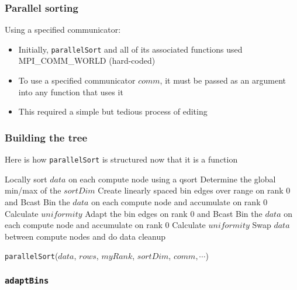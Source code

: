 \documentclass{beamer}
\begin{document}
\begin{frame}
	\frametitle{Parallel sorting}
	
	\begin{block}{Using a specified communicator:}
		\begin{itemize}
			\item Initially, \texttt{parallelSort} and all of its associated functions used MPI\_COMM\_WORLD (hard-coded)
			\item To use a specified communicator $comm$, it must be passed as an argument into any function that uses it
			\item This required a simple but tedious process of editing
		\end{itemize}
	\end{block}
\end{frame}

\begin{frame}
	\frametitle{Building the tree}
	
	Here is how \texttt{parallelSort} is structured now that it is a function
	
	\vspace{10pt}
	
	\begin{algorithm}[H]
		\begin{algorithmic}[1]
			\STATE Locally sort $data$ on each compute node using a qsort
			\STATE Determine the global min/max of the $sortDim$
			\STATE Create linearly spaced bin edges over range on rank 0 and Bcast
			\STATE Bin the $data$ on each compute node and accumulate on rank 0
			\STATE Calculate $uniformity$
				\STATE Adapt the bin edges on rank 0 and Bcast
				\STATE Bin the $data$ on each compute node and accumulate on rank 0
				\STATE Calculate $uniformity$
			\ENDWHILE
			\STATE Swap $data$ between compute nodes and do data cleanup
		\end{algorithmic}
		\caption{\texttt{parallelSort}($data$, $rows$, $myRank$, $sortDim$, $comm, \cdots$)}
	\end{algorithm}
		
\end{frame}


\subsubsection{\texttt{adaptBins}}
\end{document}
